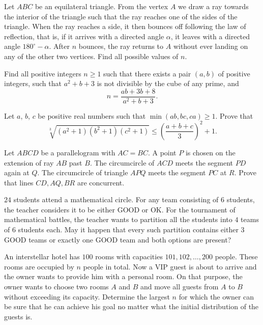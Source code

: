 \documentclass[11pt]{scrartcl}
\begin{document}
\begin{problem}[4364014706118582858]
Let $ABC$ be an equilateral triangle. From the vertex $A$ we draw a ray towards the interior of the triangle such that the ray reaches one of the sides of the triangle. When the ray reaches a side, it then bounces off following the law of reflection, that is, if it arrives with a directed angle $\alpha$, it leaves with a directed angle $180^{\circ}-\alpha$. After $n$ bounces, the ray returns to $A$ without ever landing on any of the other two vertices. Find all possible values of $n$.
\end{problem}
\begin{problem}[4375421764909014892]
	Find all positive integers $n\geq1$ such that there exists a pair $(a,b)$ of positive integers, such that $a^2+b+3$ is not divisible by the cube of any prime, and$$n=\frac{ab+3b+8}{a^2+b+3}.$$
\end{problem}
\begin{problem}[4381532748791402633]
Let $a$, $b$, $c$ be positive real numbers such that $\min(ab,bc,ca) \ge 1$. Prove that$$\sqrt[3]{(a^2+1)(b^2+1)(c^2+1)} \le \left(\frac{a+b+c}{3}\right)^2 + 1.$$
\end{problem}
\begin{problem}[4389998719836463980]
Let $ABCD$ be a parallelogram with $AC=BC.$ A point $P$ is chosen on the extension of ray $AB$ past $B.$ The circumcircle of $ACD$ meets the segment $PD$ again at $Q.$ The circumcircle of triangle $APQ$ meets the segment $PC$ at $R.$ Prove that lines $CD,AQ,BR$ are concurrent.
\end{problem}
\begin{problem}[4415914581303660291]
$24$ students attend a mathematical circle. For any team consisting of $6$ students, the teacher considers it to be either GOOD or OK. For the tournament of mathematical battles, the teacher wants to partition all the students into $4$ teams of $6$ students each. May it happen that every such partition contains either $3$ GOOD teams or exactly one GOOD team and both options are present?
\end{problem}
\begin{problem}[4429559846138102630]
An interstellar hotel has $100$ rooms with capacities $101,102,\ldots, 200$ people. These rooms are occupied by $n$ people in total. Now a VIP guest is about to arrive and the owner wants to provide him with a personal room. On that purpose, the owner wants to choose two rooms $A$ and $B$ and move all guests from $A$ to $B$ without exceeding its capacity. Determine the largest $n$ for which the owner can be sure that he can achieve his goal no matter what the initial distribution of the guests is.
\end{problem}
\end{document}

